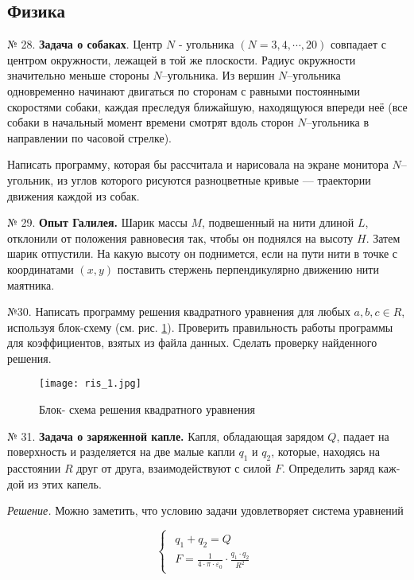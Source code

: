 \subsection{Физика}

\hspace{7mm} № 28. {\bf Задача о собаках}.
Центр $N$  - угольника $(N = 3, 4,\cdots, 20)$ совпадает с центром окружности, лежащей в той же плоскости. Радиус окружности значительно меньше стороны $N$--угольника. Из вершин $N$--угольника одновременно начинают двигаться по сторонам с равными постоянными скоростями собаки, каждая преследуя ближайшую, находящуюся впереди неё (все собаки в начальный момент времени смотрят вдоль сторон $N$--угольника в направлении по часовой стрелке).

Написать программу, которая бы рассчитала и нарисовала на экране монитора $N$--угольник, из углов которого рисуются разноцветные кривые --- траектории движения каждой из собак.

№ 29. {\bf Опыт Галилея.}
Шарик массы $M$, подвешенный на нити длиной $L$, отклонили от положения равновесия так, чтобы он поднялся на высоту $H$. Затем шарик отпустили. На какую высоту он поднимется, если на пути нити в точке с координатами $(x, y)$ поставить стержень перпендикулярно движению нити маятника.

№30. Написать программу решения квадратного уравнения для любых $a,b,c \in R$, используя блок-схему (см. рис. \ref{ris1}). Проверить правильность работы программы для коэффициентов, взятых из файла данных. Сделать проверку найденного решения.

\begin{figure}[!hb]
\centerline{\texttt{[image: ris\_1.jpg]}}
\caption{Блок- схема решения квадратного уравнения}
\label{ris1}
\end{figure}

№ 31. {\bf Задача о заряженной капле.}
Капля, обладающая зарядом $Q$, падает на поверхность и раз­деляется на две малые капли $q_1$ и $q_2$, которые, находясь на расстоянии $R$ друг от друга, взаимодействуют с силой $F$. Определить заряд каж­дой из этих капель.

{\it Решение.} Можно заметить, что условию задачи удовлетворяет система уравнений

\begin{equation}
 \begin{cases}
 \begin{aligned}
   q_1 + q_2 = Q\\
   F = \frac{1}{4\cdot\pi\cdot\varepsilon_0}\cdot\frac{q_1\cdot q_2}{R^2}
   \end{aligned}
 \end{cases}
\end{equation}

